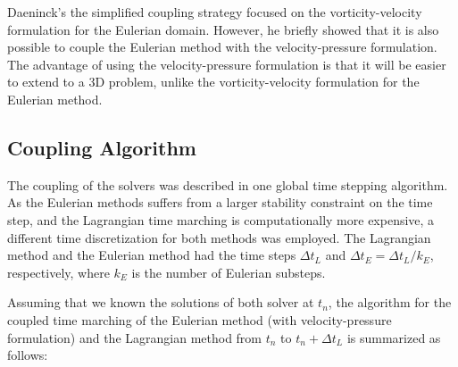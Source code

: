 	Daeninck's the simplified coupling strategy focused on the vorticity-velocity formulation for the Eulerian domain. However, he briefly showed that it is also possible to couple the Eulerian method with the velocity-pressure formulation. The advantage of using the velocity-pressure formulation is that it will be easier to extend to a 3D problem, unlike the vorticity-velocity formulation for the Eulerian method.
	
	\subsection{Coupling Algorithm}	
	\label{subsec:hybrid-ca}
	The coupling of the solvers was described in one global time stepping algorithm. As the Eulerian methods suffers from a larger stability constraint on the time step, and the Lagrangian time marching is computationally more expensive, a  different time discretization for both methods was employed. The Lagrangian method and the Eulerian method had the time steps $\Delta t_L$ and $\Delta t_E=\Delta t_L/k_E$, respectively, where $k_E$ is the number of Eulerian substeps.
	
	Assuming that we known the solutions of both solver at $t_n$, the algorithm for the coupled time marching of the Eulerian method (with velocity-pressure formulation) and the Lagrangian method from $t_n$ to $t_n+\Delta t_L$ is summarized as follows:
	
